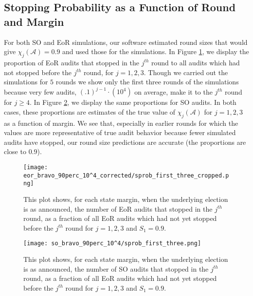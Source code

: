 \subsection{Stopping Probability as a Function of Round and Margin}
For both SO and EoR \BRAVO simulations, our software estimated round sizes that would give $\chi_j(\mathcal{A}) = 0.9$ and used those for the simulations. In Figure \ref{fig:eor_bravo_sprob}, we display the proportion of EoR \BRAVO audits that stopped in the $j^{th}$ round
to all audits which had not stopped before the $j^{th}$ round, for $j=1,2,3$. Though we carried out the simulations for $5$ rounds we show only the first three rounds of the simulations because very few audits, $(.1)^{j-1}\cdot(10^4)$ on average, 
make it to the $j^{th}$ round for $j \geq 4$. In Figure \ref{fig:so_bravo_sprob}, we display the same proportions for SO \BRAVO audits. 
In both cases, these proportions are estimates of the true value of $\chi_j(\mathcal{A})$ for $j=1,2,3$ as a function of margin. 
We see that, especially in earlier rounds for which 
the values are more representative of true audit behavior because fewer simulated audits have stopped, 
our round size predictions are accurate (the proportions are close to $0.9$).

\begin{figure}
\begin{centering}
\texttt{[image: eor\_bravo\_90perc\_10^4\_corrected/sprob\_first\_three\_cropped.png]}\caption{
This plot shows, for each state margin, when the underlying election is as announced, the number of EoR \BRAVO audits that stopped in the $j^{th}$ round,
as a fraction of all EoR \BRAVO audits which had not yet stopped before the $j^{th}$ round for $j=1,2,3$ and $S_1=0.9$.}
\label{fig:eor_bravo_sprob}
\end{centering}
\end{figure}

\begin{figure}
\begin{centering}
\texttt{[image: so\_bravo\_90perc\_10^4/sprob\_first\_three.png]}\caption{
This plot shows, for each state margin, when the underlying election is as announced, the number of SO \BRAVO audits that stopped in the $j^{th}$ round,
as a fraction of all EoR \BRAVO audits which had not yet stopped before the $j^{th}$ round for $j=1,2,3$ and $S_1=0.9$.}
\label{fig:so_bravo_sprob}
\end{centering}
\end{figure}


